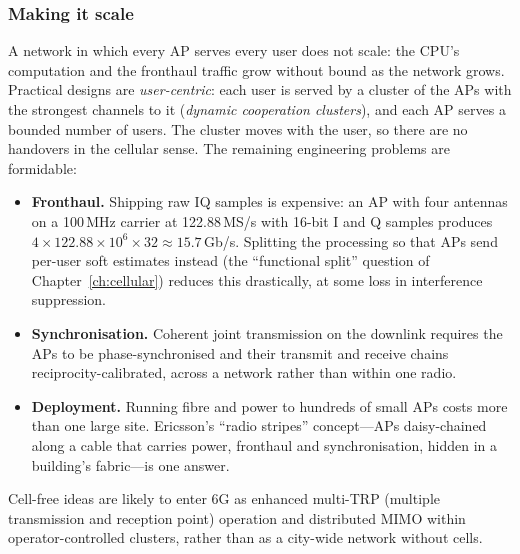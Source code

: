 \subsubsection{Making it scale}
A network in which every AP serves every user does not scale: the CPU's computation and the
fronthaul traffic grow without bound as the network grows. Practical designs are
\emph{user-centric}: each user is served by a cluster of the APs with the strongest channels to it
(\emph{dynamic cooperation clusters}), and each AP serves a bounded number of users. The cluster
moves with the user, so there are no handovers in the cellular sense. The remaining engineering
problems are formidable:
\begin{itemize}
\item \textbf{Fronthaul.} Shipping raw IQ samples is expensive: an AP with four antennas on a
100\,MHz carrier at 122.88\,MS/s with 16-bit I and Q samples produces
$4\times122.88\times10^6\times32\approx15.7$\,Gb/s. Splitting the processing so that APs send
per-user soft estimates instead (the ``functional split'' question of Chapter~\ref{ch:cellular})
reduces this drastically, at some loss in interference suppression.
\item \textbf{Synchronisation.} Coherent joint transmission on the downlink requires the APs to be
phase-synchronised and their transmit and receive chains reciprocity-calibrated, across a network
rather than within one radio.
\item \textbf{Deployment.} Running fibre and power to hundreds of small APs costs more than one large
site. Ericsson's ``radio stripes'' concept---APs daisy-chained along a cable that carries power,
fronthaul and synchronisation, hidden in a building's fabric---is one answer.
\end{itemize}
Cell-free ideas are likely to enter 6G as enhanced multi-TRP (multiple transmission and reception
point) operation and distributed MIMO within operator-controlled clusters, rather than as a
city-wide network without cells.


